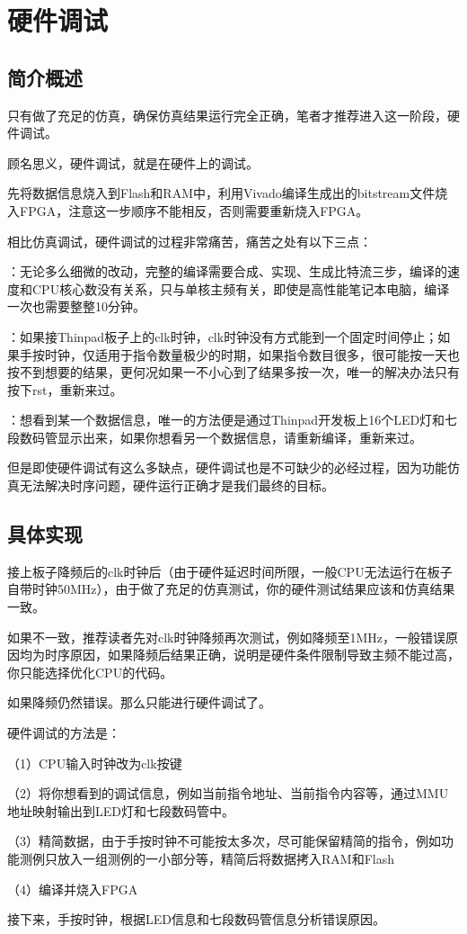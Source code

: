 \chapter{硬件调试}

\section{简介概述}

只有做了充足的仿真，确保仿真结果运行完全正确，笔者才推荐进入这一阶段，硬件调试。

顾名思义，硬件调试，就是在硬件上的调试。

先将数据信息烧入到Flash和RAM中，利用Vivado编译生成出的bitstream文件烧入FPGA，注意这一步顺序不能相反，否则需要重新烧入FPGA。

相比仿真调试，硬件调试的过程非常痛苦，痛苦之处有以下三点：

\begin{enumerate}
：无论多么细微的改动，完整的编译需要合成、实现、生成比特流三步，编译的速度和CPU核心数没有关系，只与单核主频有关，即使是高性能笔记本电脑，编译一次也需要整整10分钟。

：如果接Thinpad板子上的clk时钟，clk时钟没有方式能到一个固定时间停止；如果手按时钟，仅适用于指令数量极少的时期，如果指令数目很多，很可能按一天也按不到想要的结果，更何况如果一不小心到了结果多按一次，唯一的解决办法只有按下rst，重新来过。

：想看到某一个数据信息，唯一的方法便是通过Thinpad开发板上16个LED灯和七段数码管显示出来，如果你想看另一个数据信息，请重新编译，重新来过。
\end{enumerate}

但是即使硬件调试有这么多缺点，硬件调试也是不可缺少的必经过程，因为功能仿真无法解决时序问题，硬件运行正确才是我们最终的目标。

\section{具体实现}

接上板子降频后的clk时钟后（由于硬件延迟时间所限，一般CPU无法运行在板子自带时钟50MHz），由于做了充足的仿真测试，你的硬件测试结果应该和仿真结果一致。

如果不一致，推荐读者先对clk时钟降频再次测试，例如降频至1MHz，一般错误原因均为时序原因，如果降频后结果正确，说明是硬件条件限制导致主频不能过高，你只能选择优化CPU的代码。

如果降频仍然错误。那么只能进行硬件调试了。

硬件调试的方法是：

（1）CPU输入时钟改为clk按键

（2）将你想看到的调试信息，例如当前指令地址、当前指令内容等，通过MMU地址映射输出到LED灯和七段数码管中。

（3）精简数据，由于手按时钟不可能按太多次，尽可能保留精简的指令，例如功能测例只放入一组测例的一小部分等，精简后将数据拷入RAM和Flash

（4）编译并烧入FPGA

接下来，手按时钟，根据LED信息和七段数码管信息分析错误原因。